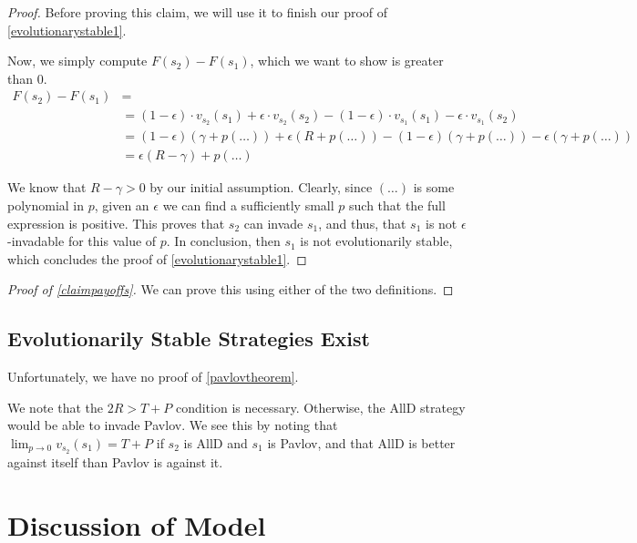 \documentclass[11pt]{amsart}
\theoremstyle{definition}
\theoremstyle{remark}
\begin{document}
\begin{proof}
      Before proving this claim, we will use it to finish our proof of \cref{evolutionarystable1}.

      Now, we simply compute $F(s_2) - F(s_1)$, which we want to show is greater than 0.
      \begin{align*}
        F(s_2) - F(s_1) &= \\
        &= (1 - \epsilon) \cdot v_{s_2}(s_1) + \epsilon \cdot v_{s_2}(s_2) - (1 - \epsilon) \cdot v_{s_1}(s_1) - \epsilon \cdot v_{s_1}(s_2) \\
        &= (1 - \epsilon) (\gamma + p(\ldots)) + \epsilon (R + p(\ldots)) - (1-\epsilon) (\gamma + p(\ldots)) - \epsilon (\gamma + p(\ldots)) \\
        &= \epsilon (R - \gamma) + p(\ldots)
      \end{align*}

      We know that $R - \gamma > 0$ by our initial assumption. Clearly, since $(\ldots)$ is some polynomial in $p$, given an $\epsilon$ we can find a sufficiently small $p$ such that the full expression is positive. This proves that $s_2$ can invade $s_1$, and thus, that $s_1$ is not $\epsilon$-invadable for this value of $p$. In conclusion, then $s_1$ is not evolutionarily stable, which concludes the proof of \cref{evolutionarystable1}.

    \end{proof}

    \begin{proof}[Proof of \cref{claimpayoffs}]
      We can prove this using either of the two definitions.
    \end{proof}

    \subsection{Evolutionarily Stable Strategies Exist}

    Unfortunately, we have no proof of \cref{pavlovtheorem}.

    We note that the $2R > T + P$ condition is necessary. Otherwise, the AllD strategy would be able to invade Pavlov. We see this by noting that $\lim_{p \to 0} v_{s_2}(s_1) = T + P$ if $s_2$ is AllD and $s_1$ is Pavlov, and that AllD is better against itself than Pavlov is against it.



    \section{Discussion of Model}
    \label{sectiondiscussion}
\end{document}

